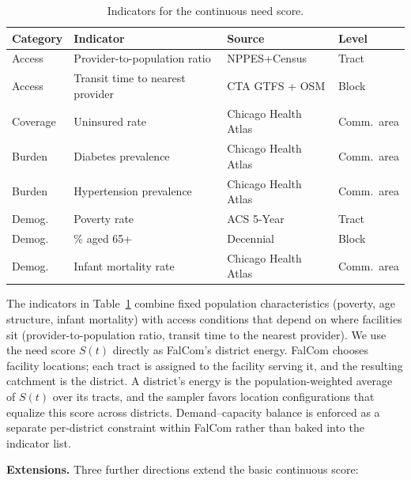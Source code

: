 \documentclass[11pt]{article}
\begin{document}
\begin{table}[H]
\centering
\caption{Indicators for the continuous need score.}
\label{tab:indicators}
\begin{tabular}{llll}
\toprule
\textbf{Category} & \textbf{Indicator} & \textbf{Source} & \textbf{Level} \\
\midrule
Access   & Provider-to-population ratio          & NPPES+Census & Tract  \\
Access   & Transit time to nearest provider      & CTA GTFS + OSM & Block \\
Coverage & Uninsured rate                        & Chicago Health Atlas & Comm.\ area \\
Burden   & Diabetes prevalence                   & Chicago Health Atlas & Comm.\ area \\
Burden   & Hypertension prevalence               & Chicago Health Atlas & Comm.\ area \\
Demog.   & Poverty rate                          & ACS 5-Year  & Tract  \\
Demog.   & \% aged 65+                           & Decennial   & Block  \\
Demog.   & Infant mortality rate                 & Chicago Health Atlas & Comm.\ area \\
\bottomrule
\end{tabular}
\end{table}

The indicators in Table~\ref{tab:indicators} combine fixed population characteristics (poverty, age structure, infant mortality) with access conditions that depend on where facilities sit (provider-to-population ratio, transit time to the nearest provider). We use the need score $S(t)$ directly as FalCom's district energy. FalCom chooses facility locations; each tract is assigned to the facility serving it, and the resulting catchment is the district. A district's energy is the population-weighted average of $S(t)$ over its tracts, and the sampler favors location configurations that equalize this score across districts. Demand--capacity balance is enforced as a separate per-district constraint within FalCom rather than baked into the indicator list.

\medskip

\noindent\textbf{Extensions.} Three further directions extend the basic continuous score:
\end{document}
